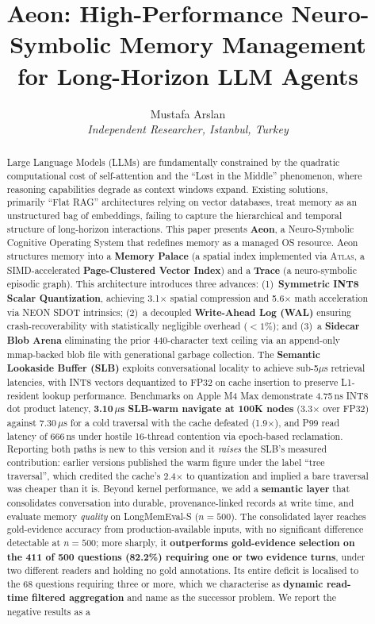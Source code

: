 \documentclass[10pt,twocolumn]{article}
\title{%
    \textbf{Aeon}: High-Performance Neuro-Symbolic Memory Management \\
    for Long-Horizon LLM Agents%
}
\author{%
    Mustafa Arslan \\
    \textit{Independent Researcher, Istanbul, Turkey}
}
\date{\vspace{-4ex}}
\begin{document}
\maketitle

\begin{abstract}
Large Language Models (LLMs) are fundamentally constrained by the quadratic computational cost of self-attention and the ``Lost in the Middle'' phenomenon, where reasoning capabilities degrade as context windows expand. Existing solutions, primarily ``Flat RAG'' architectures relying on vector databases, treat memory as an unstructured bag of embeddings, failing to capture the hierarchical and temporal structure of long-horizon interactions. This paper presents \textbf{Aeon}, a Neuro-Symbolic Cognitive Operating System that redefines memory as a managed OS resource. Aeon structures memory into a \textbf{Memory Palace} (a spatial index implemented via \textsc{Atlas}, a SIMD-accelerated \textbf{Page-Clustered Vector Index}) and a \textbf{Trace} (a neuro-symbolic episodic graph). This architecture introduces three advances: (1)~\textbf{Symmetric INT8 Scalar Quantization}, achieving 3.1$\times$ spatial compression and 5.6$\times$ math acceleration via NEON SDOT intrinsics; (2)~a decoupled \textbf{Write-Ahead Log (WAL)} ensuring crash-recoverability with statistically negligible overhead ($<1\%$); and (3)~a \textbf{Sidecar Blob Arena} eliminating the prior 440-character text ceiling via an append-only mmap-backed blob file with generational garbage collection. The \textbf{Semantic Lookaside Buffer (SLB)} exploits conversational locality to achieve sub-5$\mu$s retrieval latencies, with INT8 vectors dequantized to FP32 on cache insertion to preserve L1-resident lookup performance. Benchmarks on Apple M4 Max demonstrate 4.75\,ns INT8 dot product latency, \textbf{3.10\,$\mu$s SLB-warm navigate at 100K nodes} (3.3$\times$ over FP32) against 7.30\,$\mu$s for a cold traversal with the cache defeated (1.9$\times$), and P99 read latency of 666\,ns under hostile 16-thread contention via epoch-based reclamation. Reporting both paths is new to this version and it \emph{raises} the SLB's measured contribution: earlier versions published the warm figure under the label ``tree traversal'', which credited the cache's 2.4$\times$ to quantization and implied a bare traversal was cheaper than it is. Beyond kernel performance, we add a \textbf{semantic layer} that consolidates conversation into durable, provenance-linked records at write time, and evaluate memory \emph{quality} on LongMemEval-S ($n=500$). The consolidated layer reaches gold-evidence accuracy from production-available inputs, with no significant difference detectable at $n=500$; more sharply, it \textbf{outperforms gold-evidence selection on the 411 of 500 questions (82.2\%) requiring one or two evidence turns}, under two different readers and holding no gold annotations. Its entire deficit is localised to the 68 questions requiring three or more, which we characterise as \textbf{dynamic read-time filtered aggregation} and name as the successor problem. We report the negative results as a 
\end{abstract}
\end{document}
